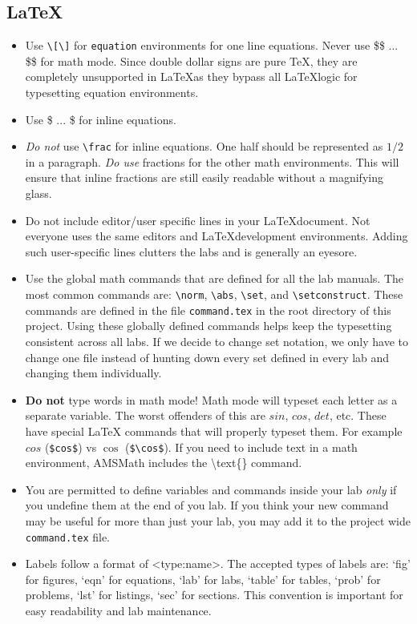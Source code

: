 \subsection{\LaTeX}
\begin{itemize}
\item Use \texttt{\textbackslash{[}\textbackslash{]}} for \texttt{equation} environments for one line equations.  
Never use \$\$ ... \$\$ for math mode.
Since double dollar signs are pure \TeX, they are completely unsupported in \LaTeX as they bypass all \LaTeX logic for typesetting equation environments.
\item Use \$ ... \$ for inline equations.
\item \emph{Do not} use \texttt{\textbackslash{frac}} for inline equations.
One half should be represented as $1/2$ in a paragraph.
\emph{Do use} fractions for the other math environments.
This will ensure that inline fractions are still easily readable without a magnifying glass.
\item Do not include editor/user specific lines in your \LaTeX document.
Not everyone uses the same editors and \LaTeX development environments.
Adding such user-specific lines clutters the labs and is generally an eyesore.
\item Use the global math commands that are defined for all the lab manuals.
The most common commands are: \texttt{\textbackslash{norm}}, \texttt{\textbackslash{abs}}, \texttt{\textbackslash{set}}, and \texttt{\textbackslash{setconstruct}}. 
These commands are defined in the file \texttt{command.tex} in the root directory of this project.
Using these globally defined commands helps keep the typesetting consistent across all labs.
If we decide to change set notation, we only have to change one file instead of hunting down every set defined in every lab and changing them individually.
\item \textbf{Do not} type words in math mode!  Math mode will typeset each letter as a separate variable.
The worst offenders of this are $sin$, $cos$, $det$, etc.
These have special LaTeX commands that will properly typeset them.
For example $cos$ (\texttt{\$cos\$}) vs $\cos$ (\texttt{\$\textbackslash cos\$}).
If you need to include text in a math environment, AMSMath includes the \textbackslash text\{\} command.
\item You are permitted to define variables and commands inside your lab \emph{only} if you undefine them at the end of you lab.
If you think your new command may be useful for more than just your lab, you may add it to the project wide \texttt{command.tex} file.
\item Labels follow a format of \textless type:name\textgreater.
The accepted types of labels are: `fig' for figures, `eqn' for equations, `lab' for labs, `table' for tables, `prob' for problems, `lst' for listings, `sec' for sections.
This convention is important for easy readability and lab maintenance.
\end{itemize}



